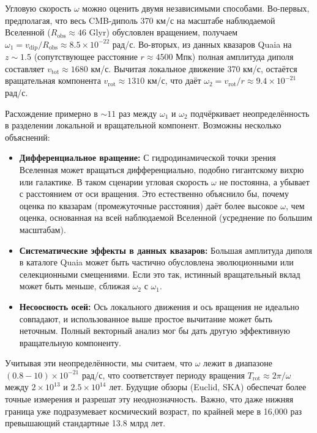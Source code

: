 \documentclass[11pt,a4paper]{article}
\begin{document}
	Угловую скорость \(\omega\) можно оценить двумя независимыми способами. Во-первых, предполагая, что весь CMB-диполь 370 км/с на масштабе наблюдаемой Вселенной (\(R_{\text{obs}} \approx 46\) Glyr) обусловлен вращением, получаем \(\omega_1 = v_{\text{dip}}/R_{\text{obs}} \approx 8.5\times10^{-22}\) рад/с. Во-вторых, из данных квазаров Quaia на \(z\sim1.5\) (сопутствующее расстояние \(r \approx 4500\) Мпк) полная амплитуда диполя составляет \(v_{\text{tot}} \approx 1680\) км/с. Вычитая локальное движение 370 км/с, остаётся вращательная компонента \(v_{\text{rot}} \approx 1310\) км/с, что даёт \(\omega_2 = v_{\text{rot}}/r \approx 9.4\times10^{-21}\) рад/с.
	
	Расхождение примерно в \(\sim11\) раз между \(\omega_1\) и \(\omega_2\) подчёркивает неопределённость в разделении локальной и вращательной компонент. Возможны несколько объяснений:
	\begin{itemize}
		\item \textbf{Дифференциальное вращение:} С гидродинамической точки зрения Вселенная может вращаться дифференциально, подобно гигантскому вихрю или галактике. В таком сценарии угловая скорость \(\omega\) не постоянна, а убывает с расстоянием от оси вращения. Это естественно объяснило бы, почему оценка по квазарам (промежуточные расстояния) даёт более высокое \(\omega\), чем оценка, основанная на всей наблюдаемой Вселенной (усреднение по большим масштабам).
		\item \textbf{Систематические эффекты в данных квазаров:} Большая амплитуда диполя в каталоге Quaia может быть частично обусловлена эволюционными или селекционными смещениями. Если это так, истинный вращательный вклад может быть меньше, сближая \(\omega_2\) с \(\omega_1\).
		\item \textbf{Несоосность осей:} Ось локального движения и ось вращения не идеально совпадают, и использованное выше простое вычитание может быть неточным. Полный векторный анализ мог бы дать другую эффективную вращательную компоненту.
	\end{itemize}
	Учитывая эти неопределённости, мы считаем, что \(\omega\) лежит в диапазоне \((0.8-10)\times10^{-21}\) рад/с, что соответствует периоду вращения \(T_{\text{rot}} \approx 2\pi/\omega\) между \(2\times10^{13}\) и \(2.5\times10^{14}\) лет. Будущие обзоры (Euclid, SKA) обеспечат более точные измерения и разрешат эту неоднозначность. Важно, что даже нижняя граница уже подразумевает космический возраст, по крайней мере в 16,000 раз превышающий стандартные 13.8 млрд лет.
	
\end{document}
